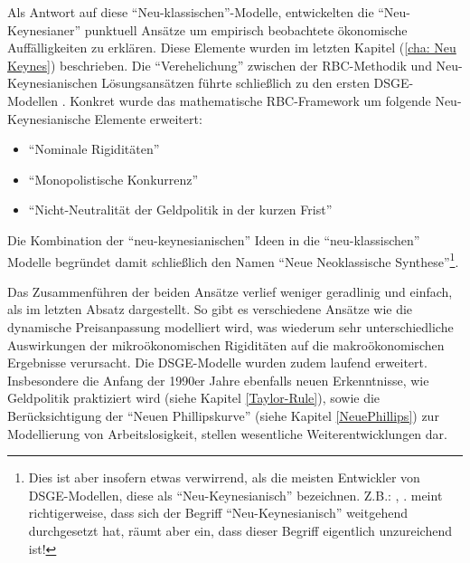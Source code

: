 Als Antwort auf diese "`Neu-klassischen"'-Modelle, entwickelten die "`Neu-Keynesianer"' punktuell Ansätze um empirisch beobachtete ökonomische Auffälligkeiten zu erklären. Diese Elemente wurden im letzten Kapitel (\ref{cha: Neu Keynes}) beschrieben. Die "`Verehelichung"' zwischen der RBC-Methodik und Neu-Keynesianischen Lösungsansätzen führte schließlich zu den ersten DSGE-Modellen \parencite[S. 5]{Gali2015}. Konkret wurde das mathematische RBC-Framework um folgende Neu-Keynesianische Elemente erweitert:
\begin{itemize}
	\item "`Nominale Rigiditäten"'
	\item "`Monopolistische Konkurrenz"'
	\item "`Nicht-Neutralität der Geldpolitik in der kurzen Frist"'   
\end{itemize}

Die Kombination der "`neu-keynesianischen"' Ideen in die "`neu-klassischen"' Modelle begründet damit schließlich den Namen "`Neue Neoklassische Synthese"'\footnote{Dies ist aber insofern etwas verwirrend, als die meisten Entwickler von DSGE-Modellen, diese als "`Neu-Keynesianisch"' bezeichnen. Z.B.: \textcite{Gali2015}, \textcite{Romer2019}. \textcite[S. 28]{Gali2007} meint richtigerweise, dass sich der Begriff "`Neu-Keynesianisch"' weitgehend durchgesetzt hat, räumt aber ein, dass dieser Begriff eigentlich unzureichend ist!}.

Das Zusammenführen der beiden Ansätze verlief weniger geradlinig und einfach, als im letzten Absatz dargestellt. So gibt es verschiedene Ansätze \parencite[S. 310]{Romer2019} wie die dynamische Preisanpassung modelliert wird, was wiederum sehr unterschiedliche Auswirkungen der mikroökonomischen Rigiditäten auf die makroökonomischen Ergebnisse verursacht. Die DSGE-Modelle wurden zudem laufend erweitert. Insbesondere die Anfang der 1990er Jahre ebenfalls neuen Erkenntnisse, wie Geldpolitik praktiziert wird (siehe Kapitel \ref{Taylor-Rule}), sowie die Berücksichtigung der "`Neuen Phillipskurve"' (siehe Kapitel \ref{NeuePhillips}) zur Modellierung von Arbeitslosigkeit, stellen wesentliche Weiterentwicklungen dar.   

